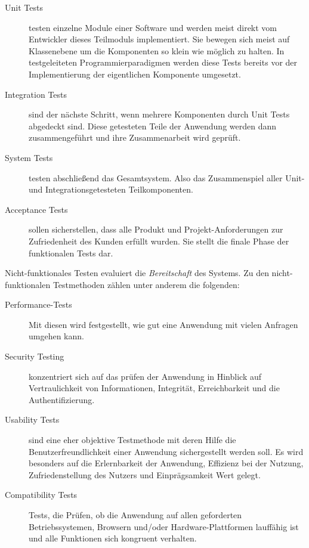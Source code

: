 \documentclass[12pt,a4paper,bibliography=totocnumbered,listof=totocnumbered]{scrartcl}
\begin{document}
\begin{description}
	\item[Unit Tests] testen einzelne Module einer Software und werden meist direkt vom Entwickler dieses Teilmoduls implementiert. Sie bewegen sich meist auf Klassenebene um die Komponenten so klein  wie möglich zu halten. In testgeleiteten Programmierparadigmen werden diese Tests bereits vor der Implementierung der eigentlichen Komponente umgesetzt.\cite{inflectra}
	\item[Integration Tests] sind der nächste Schritt, wenn mehrere Komponenten durch Unit Tests abgedeckt sind. Diese getesteten Teile der Anwendung werden dann zusammengeführt und ihre Zusammenarbeit wird geprüft.\cite{inflectra}
	\item[System Tests] testen abschließend das Gesamtsystem. Also das Zusammenspiel aller Unit- und Integrationsgetesteten Teilkomponenten.\cite{inflectra}
	\item[Acceptance Tests] sollen sicherstellen, dass alle Produkt und Projekt-Anforderungen zur Zufriedenheit des Kunden erfüllt wurden. Sie stellt die finale Phase der funktionalen Tests dar.\cite{inflectra}
\end{description}


Nicht-funktionales Testen evaluiert die \textit{Bereitschaft} des Systems.\cite{erikssontesting} Zu den nicht-funktionalen Testmethoden zählen unter anderem die folgenden\cite{inflectra}:

\begin{description}
	\item[Performance-Tests] Mit diesen wird festgestellt, wie gut eine Anwendung mit vielen Anfragen umgehen kann.
	\item[Security Testing] konzentriert sich auf das prüfen der Anwendung in Hinblick auf Vertraulichkeit von Informationen, Integrität, Erreichbarkeit und die Authentifizierung.
	\item[Usability Tests] sind eine eher objektive Testmethode mit deren Hilfe die Benutzerfreundlichkeit einer Anwendung sichergestellt werden soll. Es wird besonders auf die Erlernbarkeit der Anwendung, Effizienz bei der Nutzung, Zufriedenstellung des Nutzers und Einprägsamkeit Wert gelegt.
	\item[Compatibility Tests] Tests, die Prüfen, ob die Anwendung auf allen geforderten Betriebssystemen, Browsern und/oder Hardware-Plattformen lauffähig ist und alle Funktionen sich kongruent verhalten.
\end{description} 
\end{document}
